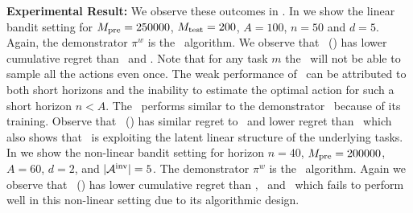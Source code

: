 \documentclass[10pt]{article}
\theoremstyle{plain}
\theoremstyle{definition}
\theoremstyle{remark}
\begin{document}
\textbf{Experimental Result:} We observe these outcomes in . In  we show the linear bandit setting for $M_{\text{pre}} = 250000$, $M_{\text{test}} = 200$, $A=100$, $n=50$ and $d=5$.
Again, the demonstrator $\pi^w$ is the \ts\ algorithm. We observe that \pred\ (\gt) has lower cumulative regret than \dptg\ and \ad. Note that for any task $m$ the \ts\ will not be able to sample all the actions even once.
The weak performance of \dptg\ can be attributed to both short horizons and the inability to estimate the optimal action for such a short horizon $n < A$. The \ad\ performs similar to the demonstrator \ts\ because of its training.
Observe that \pred\ (\gt) has similar regret to \linucb\ and lower regret than \ts\ which also shows that \pred\ is exploiting the latent linear structure of the underlying tasks.
In  we show the non-linear bandit setting for horizon $n=40$, $M_{\text{pre}} = 200000$, $A=60$, $d=2$, and $|\mathcal{A}^{\text{inv}}|=5$. The demonstrator $\pi^w$ is the \ts\ algorithm.
Again we observe that \pred\ (\gt) has lower cumulative regret than \dptg, \ad\ and \linucb\ which fails to perform well in this non-linear setting due to its algorithmic design.
\end{document}
